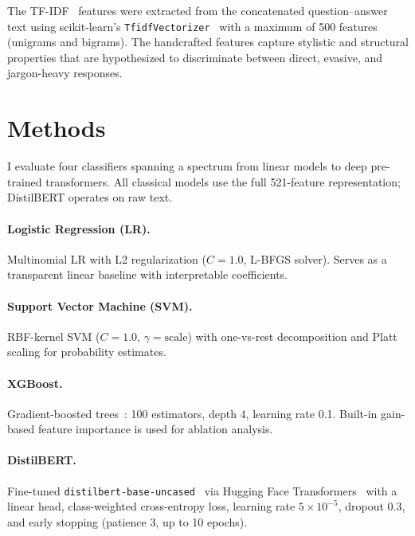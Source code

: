 \documentclass[12pt]{article}
\begin{document}
The TF-IDF~\cite{tfidf} features were extracted from the concatenated
question--answer text using scikit-learn's \texttt{TfidfVectorizer}~\cite{sklearn}
with a maximum of 500 features (unigrams and bigrams). The handcrafted features
capture stylistic and structural properties that are hypothesized to
discriminate between direct, evasive, and jargon-heavy responses.

\section{Methods}
\label{sec:methods}

I evaluate four classifiers spanning a spectrum from linear models to
deep pre-trained transformers. All classical models use the full 521-feature
representation; DistilBERT operates on raw text.

\paragraph{Logistic Regression (LR).}
Multinomial LR with L2 regularization ($C = 1.0$, L-BFGS solver).
Serves as a transparent linear baseline with interpretable coefficients.

\paragraph{Support Vector Machine (SVM).}
RBF-kernel SVM ($C = 1.0$, $\gamma = \text{scale}$) with one-vs-rest
decomposition and Platt scaling for probability estimates.

\paragraph{XGBoost.}
Gradient-boosted trees~\cite{xgboost}: 100 estimators, depth 4,
learning rate 0.1. Built-in gain-based feature importance is used for
ablation analysis.

\paragraph{DistilBERT.}
Fine-tuned \texttt{distilbert-base-uncased}~\cite{distilbert} via
Hugging Face Transformers~\cite{transformers} with a linear head,
class-weighted cross-entropy loss, learning rate $5\!\times\!10^{-5}$,
dropout 0.3, and early stopping (patience 3, up to 10 epochs).
\end{document}
